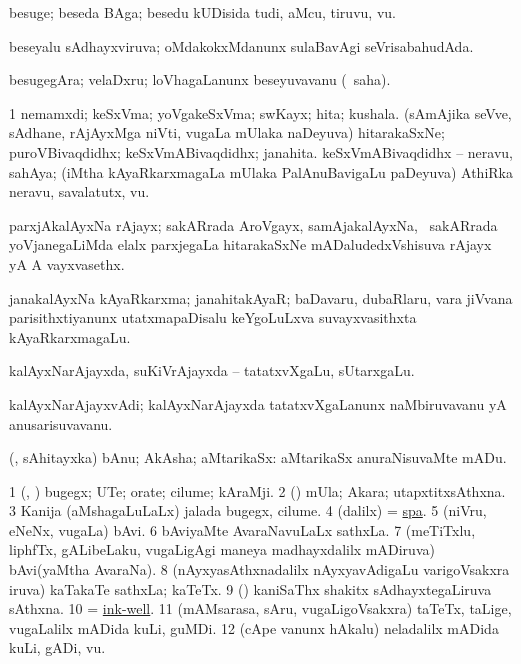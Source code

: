 \bentry
{} 
\gl{\nA}
\expl{}
\bmng
besuge; beseda BAga; besedu kUDisida tudi, aMcu, tiruvu, \mo vu. 
\emng
\eentry

\bentry
{} 
\gl{\gu}
\expl{}
\bmng
beseyalu sAdhayxviruva; oMdakokxMdanunx sulaBavAgi seVrisabahudAda. 
\emng
\eentry

\bentry
{} 
\gl{\nA}
\expl{}
\bmng
besugegAra; velaDxru; loVhagaLanunx beseyuvavanu (\rUpa\ saha). 
\emng
\eentry

\bentry
{} 
\gl{\nA}
\expl{}
\bmng
\bnum
\num{1} nemamxdi; keSxVma; yoVgakeSxVma; swKayx; hita; kushala. 
  
\banum
{} (sAmAjika seVve, sAdhane, rAjAyxMga niVti, \mo vugaLa mUlaka naDeyuva) hitarakaSxNe; puroVBivaqdidhx; keSxVmABivaqdidhx; janahita. 
 keSxVmABivaqdidhx -- neravu, sahAya; (iMtha kAyaRkarxmagaLa mUlaka PalAnuBavigaLu paDeyuva) AthiRka neravu, savalatutx, \mo vu. 
\eanum
\numie
\enum
\emng
\eentry

\bentry
{} 
\gl{\nA}
\expl{}
\bmng
parxjAkalAyxNa rAjayx; sakARrada AroVgayx, samAjakalAyxNa, \mo\ sakARrada yoVjanegaLiMda elalx parxjegaLa hitarakaSxNe mADaludedxVshisuva rAjayx yA A vayxvasethx. 
\emng
\eentry

\bentry
{} 
\gl{\nA}
\expl{}
\bmng
janakalAyxNa kAyaRkarxma; janahitakAyaR; baDavaru, dubaRlaru, \mo vara jiVvana parisithxtiyanunx utatxmapaDisalu keYgoLuLxva suvayxvasithxta kAyaRkarxmagaLu. 
\emng
\eentry

\bentry
{} 
\gl{\nA}
\expl{}
\bmng
kalAyxNarAjayxda, suKiVrAjayxda -- tatatxvXgaLu, sUtarxgaLu. 
\emng
\eentry

\bentry
{} 
\gl{\nA}
\expl{}
\bmng
kalAyxNarAjayxvAdi; kalAyxNarAjayxda tatatxvXgaLanunx naMbiruvavanu yA anusarisuvavanu. 
\emng
\eentry

\bentry
{} 
\gl{\nA}
\expl{}
\bmng
(\kAparx, sAhitayxka) bAnu; AkAsha; aMtarikaSx:  aMtarikaSx anuraNisuvaMte mADu. 
\emng
\eentry

\bentry
{} 
\gl{\nA}
\expl{}
\bmng
\bnum
\num{1} (\kAparx, \pArxparx) bugegx; UTe; orate; cilume; kAraMji. 
\num{2} (\rUpa) mUla; Akara; utapxtitxsAthxna. 
\num{3} Kanija (aMshagaLuLaLx) jalada bugegx, cilume. 
\num{4} (\bava dalilx) = \hyperref{kandict_s.pdf}{S}{spa}{spa}. 
\num{5} (niVru, eNeNx, \mo vugaLa) bAvi. 
\num{6} bAviyaMte AvaraNavuLaLx sathxLa. 
\num{7} (meTiTxlu, liphfTx, gALibeLaku, \mo vugaLigAgi maneya madhayxdalilx mADiruva) bAvi(yaMtha AvaraNa). 
\num{8} (nAyxyasAthxnadalilx nAyxyavAdigaLu \mo varigoVsakxra iruva) kaTakaTe sathxLa; kaTeTx. 
\num{9} (\Bwvi) kaniSaThx shakitx sAdhayxtegaLiruva sAthxna. 
\num{10} = \hyperref{kandict_i.pdf}{I}{ink-well}{ink-well}. 
\num{11} (mAMsarasa, sAru, \mo vugaLigoVsakxra) taTeTx, taLige, \mo vugaLalilx mADida kuLi, guMDi. 
\num{12} (cApe \mo vanunx hAkalu) neladalilx mADida kuLi, gADi, \mo vu. 
\enum
\emng

